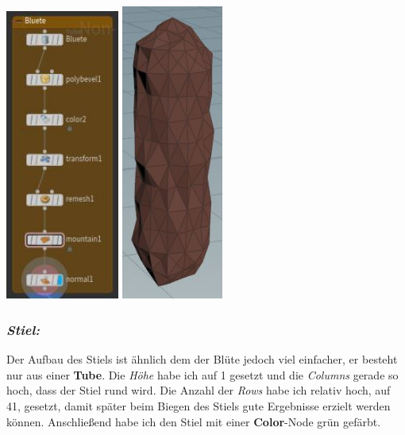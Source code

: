 \documentclass[paper=a4,fontsize=12pt,ngerman]{scrartcl}
\begin{document}
	\begin{minipage}{0.5\textwidth}
		\includegraphics[width=0.28\textwidth]{graphics/bluete_node.jpg}
		\includegraphics[width=0.25\textwidth]{graphics/bluete.jpg}
	\end{minipage}
	\subsubsection*{\textit{Stiel:}}
	Der Aufbau des Stiels ist ähnlich dem der Blüte jedoch viel einfacher, er besteht nur aus einer \textbf{Tube}. Die \textit{Höhe} habe ich auf 1 gesetzt und die \textit{Columns} gerade so hoch, dass der Stiel rund wird. Die Anzahl der \textit{Rows} habe ich relativ hoch, auf 41, gesetzt, damit später beim Biegen des Stiels gute Ergebnisse erzielt werden können. Anschließend habe ich den Stiel mit einer \textbf{Color}-Node grün gefärbt.
\end{document}
